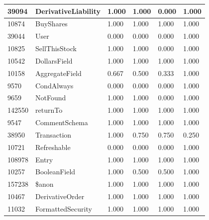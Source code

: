\documentclass[a4paper]{article}
\newlength{\DUtablewidth} %
\begin{document}
\begin{longtable*}[c]{|p{0.160\DUtablewidth}|p{0.160\DUtablewidth}|p{0.160\DUtablewidth}|p{0.160\DUtablewidth}|p{0.160\DUtablewidth}|p{0.160\DUtablewidth}|}
39094
 & 
DerivativeLiability
 & 
1.000
 & 
1.000
 & 
0.000
 & 
1.000
 \\
\hline

10874
 & 
BuyShares
 & 
1.000
 & 
1.000
 & 
1.000
 & 
1.000
 \\
\hline

39044
 & 
User
 & 
0.000
 & 
0.000
 & 
0.000
 & 
1.000
 \\
\hline

10825
 & 
SellThisStock
 & 
1.000
 & 
1.000
 & 
0.000
 & 
1.000
 \\
\hline

10542
 & 
DollarsField
 & 
1.000
 & 
1.000
 & 
1.000
 & 
1.000
 \\
\hline

10158
 & 
AggregateField
 & 
0.667
 & 
0.500
 & 
0.333
 & 
1.000
 \\
\hline

9570
 & 
CondAlways
 & 
0.000
 & 
0.000
 & 
0.000
 & 
1.000
 \\
\hline

9659
 & 
NotFound
 & 
1.000
 & 
1.000
 & 
0.000
 & 
1.000
 \\
\hline

142550
 & 
returnTo
 & 
1.000
 & 
1.000
 & 
1.000
 & 
1.000
 \\
\hline

9547
 & 
CommentSchema
 & 
1.000
 & 
1.000
 & 
1.000
 & 
1.000
 \\
\hline

38950
 & 
Transaction
 & 
1.000
 & 
0.750
 & 
0.750
 & 
0.250
 \\
\hline

10721
 & 
Refreshable
 & 
0.000
 & 
0.000
 & 
0.000
 & 
1.000
 \\
\hline

108978
 & 
Entry
 & 
1.000
 & 
1.000
 & 
1.000
 & 
1.000
 \\
\hline

10257
 & 
BooleanField
 & 
1.000
 & 
0.500
 & 
0.500
 & 
1.000
 \\
\hline

157238
 & 
\$anon
 & 
1.000
 & 
1.000
 & 
1.000
 & 
1.000
 \\
\hline

10467
 & 
DerivativeOrder
 & 
1.000
 & 
1.000
 & 
1.000
 & 
1.000
 \\
\hline

11032
 & 
FormattedSecurity
 & 
1.000
 & 
1.000
 & 
1.000
 & 
1.000
 \\
\hline


\end{longtable*}
\end{document}
